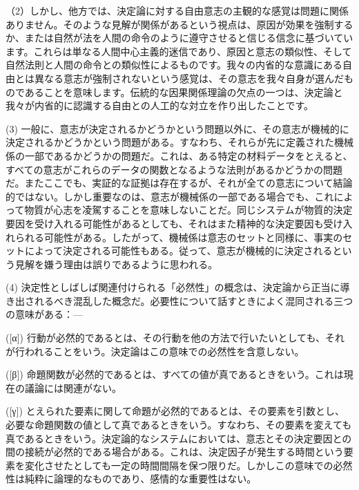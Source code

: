 \documentclass[a4paper,11pt,openany]{ltjsbook}
\begin{document}
（2）しかし、他方では、決定論に対する自由意志の主観的な感覚は問題に関係ありません。そのような見解が関係があるという視点は、原因が効果を強制するか、または自然が法を人間の命令のように遵守させると信じる信念に基づいています。これらは単なる人間中心主義的迷信であり、原因と意志の類似性、そして自然法則と人間の命令との類似性によるものです。我々の内省的な意識にある自由とは異なる意志が強制されないという感覚は、その意志を我々自身が選んだものであることを意味します。伝統的な因果関係理論の欠点の一つは、決定論と我々が内省的に認識する自由との人工的な対立を作り出したことです。

(3) 一般に、意志が決定されるかどうかという問題以外に、その意志が機械的に決定されるかどうかという問題がある。すなわち、それらが先に定義された機械係の一部であるかどうかの問題だ。これは、ある特定の材料データをとえると、すべての意志がこれらのデータの関数となるような法則があるかどうかの問題だ。またここでも、実証的な証拠は存在するが、それが全ての意志について結論的ではない。しかし重要なのは、意志が機械係の一部である場合でも、これによって物質が心志を凌駕することを意味しないことだ。同じシステムが物質的決定要因を受け入れる可能性があるとしても、それはまた精神的な決定要因も受け入れられる可能性がある。したがって、機械係は意志のセットと同様に、事実のセットによって決定される可能性もある。従って、意志が機械的に決定されるという見解を嫌う理由は誤りであるように思われる。

(4) 決定性としばしば関連付けられる「必然性」の概念は、決定論から正当に導き出されるべき混乱した概念だ。必要性について話すときによく混同される三つの意味がある：—

([α]) 行動が必然的であるとは、その行動を他の方法で行いたいとしても、それが行われることをいう。決定論はこの意味での必然性を含意しない。

([β]) 命題関数が必然的であるとは、すべての値が真であるときをいう。これは現在の議論には関連がない。

([γ]) とえられた要素に関して命題が必然的であるとは、その要素を引数とし、必要な命題関数の値として真であるときをいう。すなわち、その要素を変えても真であるときをいう。決定論的なシステムにおいては、意志とその決定要因との間の接続が必然的である場合がある。これは、決定因子が発生する時間という要素を変化させたとしても一定の時間間隔を保つ限りだ。しかしこの意味での必然性は純粋に論理的なものであり、感情的な重要性はない。
\end{document}
